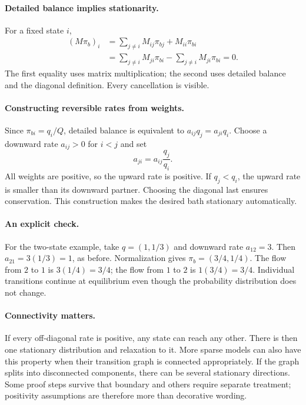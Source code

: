 \paragraph{Detailed balance implies stationarity.}
For a fixed state $i$,
\begin{align*}
(M\pi_b)_i
&=\sum_{j\ne i}M_{ij}\pi_{bj}+M_{ii}\pi_{bi}\\
&=\sum_{j\ne i}M_{ji}\pi_{bi}
-\sum_{j\ne i}M_{ji}\pi_{bi}=0.
\end{align*}
The first equality uses matrix multiplication; the second uses detailed
balance and the diagonal definition. Every cancellation is visible.

\paragraph{Constructing reversible rates from weights.}
Since $\pi_{bi}=q_i/Q$, detailed balance is equivalent to
$a_{ij}q_j=a_{ji}q_i$. Choose a downward rate $a_{ij}>0$ for $i<j$ and set
\[
a_{ji}=a_{ij}\frac{q_j}{q_i}.
\]
All weights are positive, so the upward rate is positive. If $q_j<q_i$,
the upward rate is smaller than its downward partner. Choosing the diagonal
last ensures conservation. This construction makes the desired bath
stationary automatically.

\paragraph{An explicit check.}
For the two-state example, take $q=(1,1/3)$ and downward rate $a_{12}=3$.
Then $a_{21}=3(1/3)=1$, as before. Normalization gives
$\pi_b=(3/4,1/4)$. The flow from $2$ to $1$ is $3(1/4)=3/4$;
the flow from $1$ to $2$ is $1(3/4)=3/4$. Individual transitions continue
at equilibrium even though the probability distribution does not change.

\paragraph{Connectivity matters.}
If every off-diagonal rate is positive, any state can reach any other.
There is then one stationary distribution and relaxation to it. More
sparse models can also have this property when their transition graph is
connected appropriately. If the graph splits into disconnected components,
there can be several stationary directions. Some proof steps survive that
boundary and others require separate treatment; positivity assumptions are
therefore more than decorative wording.

